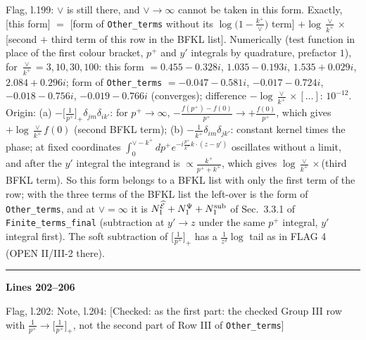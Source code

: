 \documentclass[10pt]{article}
\newenvironment{notebox}{\def\FrameCommand{{\color{notebar}\vrule width 1.5pt}\hspace{6pt}}\MakeFramed{\advance\hsize-\width\FrameRestore}\small}{\endMakeFramed}
\begin{document}
\begin{notebox}\textsf{\small Flag, l.199:}  $\vee$ is still there, and $\vee\to\infty$ cannot be taken in this form. Exactly, [this form] $=$ [form of \texttt{Other\_terms} without its $\log\big(1-\frac{k^{+}}{\vee}\big)$ term] $+\log\frac{\vee}{k^{+}}\times$[second $+$ third term of this row in the BFKL list]. Numerically (test function in place of the first colour bracket, $p^{+}$ and $y'$ integrals by quadrature, prefactor $1$), for $\frac{\vee}{k^{+}}=3,10,30,100$: this form $=0.455-0.328i$, $1.035-0.193i$, $1.535+0.029i$, $2.084+0.296i$; form of \texttt{Other\_terms} $=-0.047-0.581i$, $-0.017-0.724i$, $-0.018-0.756i$, $-0.019-0.766i$ (converges); difference $-\log\frac{\vee}{k^{+}}\times[\dots]$: $10^{-12}$. Origin: (a) $-\big[\frac{1}{p^{+}}\big]_{+}\delta_{jm}\delta_{ik'}$: for $p^{+}\to\infty$, $-\frac{f(p^{+})-f(0)}{p^{+}}\to+\frac{f(0)}{p^{+}}$, which gives $+\log\frac{\vee}{k^{+}}f(0)$ (second BFKL term); (b) $-\frac{1}{k^{+}}\delta_{im}\delta_{jk'}$: constant kernel times the phase; at fixed coordinates $\int_{0}^{\vee-k^{+}}dp^{+}e^{-i\frac{p^{+}}{k^{+}}k\cdot(z-y')}$ oscillates without a limit, and after the $y'$ integral the integrand is $\propto\frac{k^{+}}{p^{+}+k^{+}}$, which gives $\log\frac{\vee}{k^{+}}\times$(third BFKL term). So this form belongs to a BFKL list with only the first term of the row; with the three terms of the BFKL list the left-over is the form of \texttt{Other\_terms}, and at $\vee=\infty$ it is $N_{1}^{\widehat{\mathcal{E}}}+N_{1}^{\Psi}+N_{1}^{\rm sub}$ of Sec.~3.3.1 of \texttt{Finite\_terms\_final} (subtraction at $y'\to z$ under the same $p^{+}$ integral, $y'$ integral first). The soft subtraction of $\big[\frac{1}{p^{+}}\big]_{+}$ has a $\frac{1}{z^{2}}\log$ tail as in FLAG 4 (OPEN II/III-2 there).\end{notebox}
\noindent\rule{\linewidth}{0.3pt}\par\noindent\textbf{Lines 202--206} \par
\begin{notebox}\textsf{\small Flag, l.202:} \end{notebox}
\begin{notebox}\textsf{\small Note, l.204:} [Checked: as the first part: the checked Group III row with $\frac{1}{p^{+}}\to\big[\frac{1}{p^{+}}\big]_{+}$, not the second part of Row III of \texttt{Other\_terms}]\end{notebox}
\end{document}
